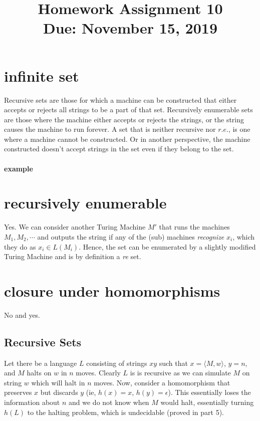 \documentclass[11pt,letterpaper]{article}
\title{Homework Assignment 10 \\
    \small Due: November 15, 2019}
\begin{document}
\maketitle

\section{infinite set}
Recursive sets are those for which a machine can be constructed that either accepts or rejects all strings to be a part of that set. Recursively enumerable sets are those where the machine either accepts or rejects the strings, or the string causes the machine to run forever. A set that is neither recursive nor $r.e.$, is one where a machine cannot be constructed. Or in another perspective, the machine constructed doesn't accept strings in the set even if they belong to the set.
\paragraph{example} 

\section{recursively enumerable}
Yes. We can consider another Turing Machine $M'$ that runs the machines $M_1,M_2,\cdots$ and outputs the string if any of the (sub) machines \textit{recognize} $x_i$, which they do as $x_i \in L(M_i)$. Hence, the set can be enumerated by a slightly modified Turing Machine and is by definition a \textit{re} set.
\pagebreak
\section{closure under homomorphisms}
No and yes.

\subsection{Recursive Sets}
Let there be a language $L$ consisting of strings $xy$ such that $x= \langle M,w \rangle$, $y=n$, and $M$ halts on $w$ in $n$ moves. Clearly $L$ is is recursive as we can simulate $M$ on string $w$ which will halt in $n$ moves. Now, consider a homomorphism that preserves $x$ but discards $y$ (ie, $h(x)=x$, $h(y)=\epsilon$). This essentially loses the information about $n$ and we do not know when $M$ would halt, essentially turning $h(L)$ to the halting problem, which is undecidable (proved in part 5).
\end{document}
